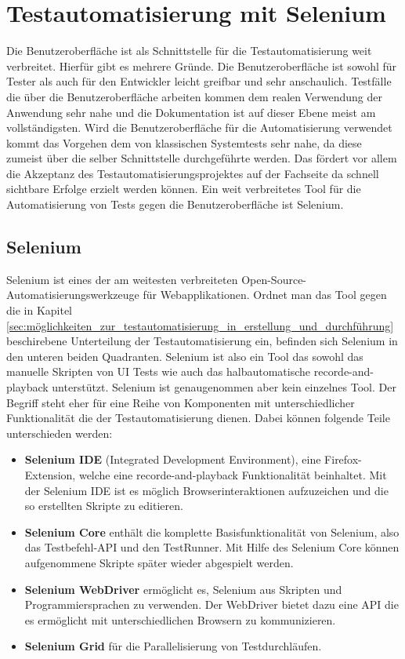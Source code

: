 \chapter{Testautomatisierung mit Selenium}
\label{sec:testautomatisierung_mit_selenium}
Die Benutzeroberfläche ist als Schnittstelle für die Testautomatisierung weit verbreitet. Hierfür gibt es mehrere Gründe. Die Benutzeroberfläche ist sowohl für Tester als auch für den Entwickler leicht greifbar und sehr anschaulich. Testfälle die über die Benutzeroberfläche arbeiten kommen dem realen Verwendung der Anwendung sehr nahe und die Dokumentation ist auf dieser Ebene meist am vollständigsten. Wird die Benutzeroberfläche für die Automatisierung verwendet kommt das Vorgehen dem von klassischen Systemtests sehr nahe, da diese zumeist über die selber Schnittstelle durchgeführte werden. \cite[vgl. Seite 48]{seidl_basiswissen_2012} Das fördert vor allem die Akzeptanz des Testautomatisierungsprojektes auf der Fachseite da schnell sichtbare Erfolge erzielt werden können. 
Ein weit verbreitetes Tool für die Automatisierung von Tests gegen die Benutzeroberfläche ist Selenium.

\section{Selenium}
\label{sec:selenium}
Selenium ist eines der am weitesten verbreiteten Open-Source-Automatisierungswerkzeuge für Webapplikationen. Ordnet man das Tool gegen die in Kapitel \ref{sec:möglichkeiten_zur_testautomatisierung_in_erstellung_und_durchführung} beschirebene Unterteilung der Testautomatisierung ein, befinden sich Selenium in den unteren beiden Quadranten.
Selenium ist also ein Tool das sowohl das manuelle Skripten von UI Tests wie auch das halbautomatische recorde-and-playback unterstützt. Selenium ist genaugenommen aber kein einzelnes Tool. Der Begriff steht eher für eine Reihe von Komponenten mit unterschiedlicher Funktionalität die der Testautomatisierung dienen. Dabei können folgende Teile unterschieden werden:

\begin{itemize}
	  \itemsep0pt
      \item \textbf{Selenium IDE} (Integrated Development Environment), eine Firefox-Extension, welche eine recorde-and-playback Funktionalität beinhaltet. Mit der Selenium IDE ist es möglich Browserinteraktionen aufzuzeichen und die so erstellten Skripte zu editieren.
      \item \textbf{Selenium Core} enthält die komplette Basisfunktionalität von Selenium, also das Testbefehl-API und den TestRunner. Mit Hilfe des Selenium Core können aufgenommene Skripte später wieder abgespielt werden.
      \item \textbf{Selenium WebDriver} ermöglicht es, Selenium aus Skripten und Programmiersprachen zu verwenden. Der WebDriver bietet dazu eine API die es ermöglicht mit unterschiedlichen Browsern zu kommunizieren.
      \item \textbf{Selenium Grid} für die Parallelisierung von Testdurchläufen.     
\end{itemize}


